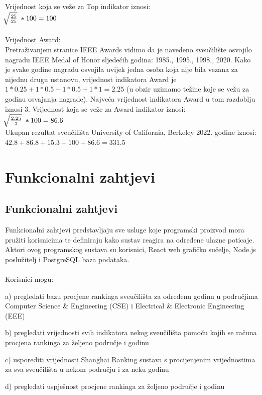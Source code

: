 \documentclass[times, utf8, zavrsni]{fer}
\begin{document}
Vrijednost koja se veže za Top indikator iznosi: \; \\ $\sqrt[\leftroot{-2}]{\frac{25}{25}} \; * 100 = 100$
\\
\\ \underline{Vrijednost Award:} 
\\ Pretraživanjem stranice IEEE Awards vidimo da je navedeno sveučilište osvojilo nagradu IEEE Medal of Honor sljedećih godina: 1985., 1995., 1998., 2020. Kako je 
svake godine nagradu osvojila uvijek jedna osoba koja nije bila vezana za nijednu drugu ustanovu, vrijednost 
indikatora Award je $1*0.25+1*0.5+1*0.5+1*1 = 2.25$ (u obzir uzimamo težine koje se vežu za godinu osvajanja nagrade). Najveća vrijednost 
indikatora Award u tom razdoblju iznosi 3. Vrijednost koja se veže za Award indikator iznosi: \; \\ $\sqrt[\leftroot{-2}]{\frac{2.25}{3}} \; * 100 = 86.6$
\\Ukupan rezultat sveučilišta University of California, Berkeley 2022. godine iznosi: $42.8+86.8+15.3+100+86.6 = 331.5$ 

\chapter{Funkcionalni zahtjevi}
\section{Funkcionalni zahtjevi}
Funkcionalni zahtjevi predstavljaju sve usluge koje programski proizvod mora pružiti korisnicima te definiraju kako sustav reagira na određene ulazne poticaje.
\\ Aktori ovog programskog sustava su korisnici, React web grafičko sučelje, Node.js poslužitelj i PostgreSQL baza podataka.
\\
\\Korisnici mogu:

a) pregledati bazu procjene rankinga sveučilišta za određenu godinu u područjima Computer Science \& Engineering (CSE) 
i Electrical \& Electronic Engineering (EEE)

b) pregledati vrijednosti svih indikatora nekog sveučilišta pomoću kojih se računa procjena rankinga za željeno područje i godinu

c) usporediti vrijednosti Shanghai Ranking sustava s procijenjenim vrijednostima za sva sveučilišta u nekom području i za neku godinu

d) pregledati uspješnost procjene rankinga za željeno područje i godinu
\end{document}
